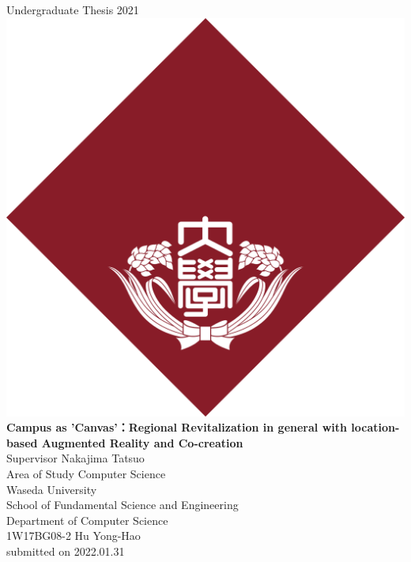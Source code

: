 \documentclass[a4paper, 12pt, oneside]{book}
\begin{document}

\begin{titlepage}
\begin{center}
    \vspace{0.1\textheight}
    {\Large Undergraduate Thesis 2021} \\
    \vspace{0.05\textheight}
    \includegraphics[width=48truemm]{resources/0_title/waseda_logo.png} \\
    \vspace{0.05\textheight}
    \textbf{\huge Campus as 'Canvas'：Regional Revitalization in general with location-based Augmented Reality and Co-creation} \\
    \vfill
    {\Large Supervisor \hspace{0.02\textwidth} Nakajima Tatsuo} \\
    {\Large Area of Study \hspace{0.02\textwidth} Computer Science} \\
    \vspace{0.05\textheight}
    {\Large 
        Waseda University \\
        School of Fundamental Science and Engineering \\
        Department of Computer Science \\}
    \vspace{0.05\textheight}
    {\Large 1W17BG08-2 Hu Yong-Hao \\}
    \vspace{0.05\textheight}
    {submitted on 2022.01.31}
\end{center}
\end{titlepage}
\end{document}
